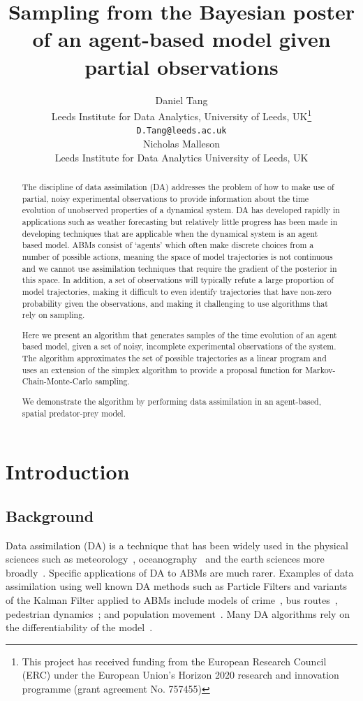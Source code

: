 \documentclass{article}
\title{Sampling from the Bayesian poster of an agent-based model given partial observations}
\author{
  Daniel Tang\\
    Leeds Institute for Data Analytics, University of Leeds, UK\thanks{This project has received funding from the European Research Council (ERC) under the European Union’s Horizon 2020 research and innovation programme (grant agreement No. 757455)}\\
  \texttt{D.Tang@leeds.ac.uk}\\
  \AND
  Nicholas Malleson\\
  Leeds Institute for Data Analytics University of Leeds, UK\\  
}
\begin{document}
\maketitle

\begin{abstract}
The discipline of data assimilation (DA) addresses the problem of how to make use of partial, noisy experimental observations to provide information about the time evolution of unobserved properties of a dynamical system. DA has developed rapidly in applications such as weather forecasting \cite{kalnay_atmospheric_2003} but relatively little progress has been made in developing techniques that are applicable when the dynamical system is an agent based model. ABMs consist of `agents' which often make discrete choices from a number of possible actions, meaning the space of model trajectories is not continuous and we cannot use assimilation techniques that require the gradient of the posterior in this space. In addition, a set of observations will typically refute a large proportion of model trajectories, making it difficult to even identify trajectories that have non-zero probability given the observations, and making it challenging to use algorithms that rely on sampling.

Here we present an algorithm that generates samples of the time evolution of an agent based model, given a set of noisy, incomplete experimental observations of the system. The algorithm approximates the set of possible trajectories as a linear program and uses an extension of the simplex algorithm to provide a proposal function for Markov-Chain-Monte-Carlo sampling.

We demonstrate the algorithm by performing data assimilation in an agent-based, spatial predator-prey model.
\end{abstract}


\section{Introduction}

\subsection{Background}\label{sec:background}

Data assimilation (DA) is a technique that has been widely used in the physical sciences such as meteorology~\cite{kalnay_atmospheric_2003}, oceanography~\cite{bertino_sequential_2003} and the earth sciences more broadly~\cite{reichle_data_2008}. Specific applications of DA to ABMs are much rarer. Examples of data assimilation using well known DA methods such as Particle Filters and variants of the Kalman Filter applied to ABMs include models of crime~\cite{lloyd_exploring_2016}, bus routes~\cite{kieu_dealing_2020}, pedestrian dynamics~\cite{wang_data_2015, ward_dynamic_2016, clay_realtime_2020, malleson_simulating_2020};
and population movement~\cite{lueck_who_2019}. Many DA algorithms rely on the differentiability of the model~\cite{lewis_dynamic_2006}.
\end{document}
